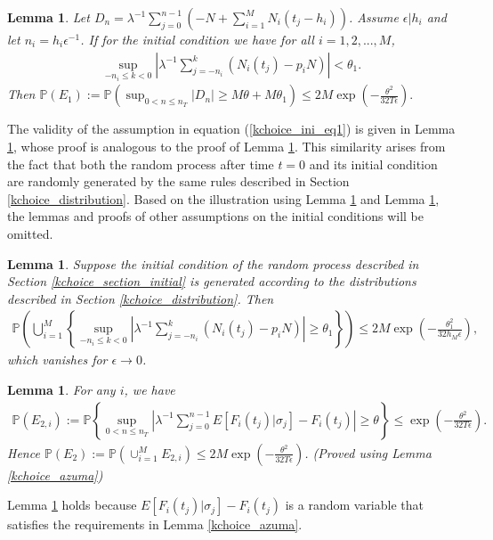 \documentclass[12pt]{article}
\def\P{\mathbb{P}}
\numberwithin{equation}{section}  %
\newtheorem{lem}[thm]{Lemma}
\begin{document}
\begin{lem}\label{kchoice_dn} %
Let $D_n=\lambda^{-1}\sum_{j=0}^{n-1} \left(-N+\sum_{i=1}^M N_i(t_j-h_i)\right)$. Assume $\epsilon|h_i$ and let $n_i=h_i\epsilon^{-1}$. 
If for the initial condition we have for all $i=1,2,...,M$,
\begin{align}
\sup_{-n_i\leq k< 0}\left|\lambda^{-1}\sum_{j=-n_i}^{k} \left(N_i(t_j)-p_i N\right)\right|<\theta_1 \label{kchoice_ini_eq1}.
\end{align}
Then $\P(E_1):=\P(\sup_{0<n\leq n_T}|D_n|\geq M\theta+M\theta_1)\leq 2M\exp\left(-\frac{\theta^2}{32T\epsilon}\right).$
\end{lem}

The validity of the assumption in equation (\ref{kchoice_ini_eq1}) is given in Lemma \ref{lem_Initial_condition}, whose proof is analogous to the proof of Lemma \ref{kchoice_dn}. This similarity arises from the fact that both the random process after time $t=0$ and its initial condition are randomly generated by the same rules described in Section \ref{kchoice_distribution}. Based on the illustration using Lemma \ref{kchoice_dn} and Lemma \ref{lem_Initial_condition}, the lemmas and proofs of other assumptions on the initial conditions will be omitted.

\begin{lem}\label{lem_Initial_condition}
Suppose the initial condition of the random process described in Section \ref{kchoice_section_initial} is generated according to the distributions described in Section \ref{kchoice_distribution}. Then 
\begin{align*}
\P\left(\bigcup_{i=1}^{M}\left\{\sup_{-n_i\leq k<0}\left|\lambda^{-1}\sum_{j=-n_i}^{k} \left(N_i(t_j)-p_iN\right)\right|\geq\theta_1\right\}\right)\leq 2M\exp\left(-\frac{\theta_1^2}{32h_M\epsilon}\right),
\end{align*}
which vanishes for $\epsilon\rightarrow 0$.
\end{lem}

\begin{lem}\label{kchoice_df1}
For any $i$, we have
\begin{align*} 
\P(E_{2,i}):=\P\left\{\sup_{0< n\leq n_T}\left|\lambda^{-1}\sum_{j=0}^{n-1}  E[F_i(t_j)|\sigma_j]-F_i(t_j)\right|\geq \theta  \right\}\leq \exp\left(-\frac{\theta^2}{32T\epsilon}\right).
\end{align*} 
Hence $\P(E_2):=\P(\cup_{i=1}^M E_{2,i})\leq 2M\exp\left(-\frac{\theta^2}{32T\epsilon}\right)$. (Proved using Lemma \ref{kchoice_azuma})
\end{lem}
Lemma \ref{kchoice_df1} holds because $E[F_i(t_j)|\sigma_j]-F_i(t_j)$ is a random variable that satisfies the requirements in Lemma \ref{kchoice_azuma}.
\end{document}
